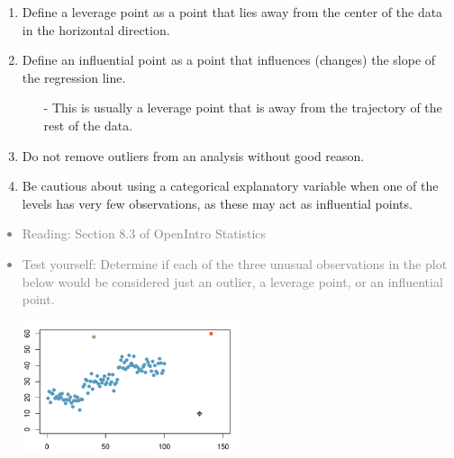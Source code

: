 \documentclass[11pt]{article}
\newcommand{\gray}[1]{\textcolor{gray}{#1}}
\begin{document}
\vspace{0.48cm}

%

\begin{enumerate}[resume]
\renewcommand\labelenumi{\textcolor{light}{\textbf{LO \theenumi.}}}

\item Define a leverage point as a point that lies away from the center of the data in the horizontal direction.

\item Define an influential point as a point that influences (changes) the slope of the regression line.
\begin{itemize}
\item[-] This is usually a leverage point that is away from the trajectory of the rest of the data.
\end{itemize}

\item Do not remove outliers from an analysis without good reason.

\item Be cautious about using a categorical explanatory variable when one of the levels has very few observations, as these may act as influential points.

\end{enumerate}

\gray{
{\it
\vspace{-0.55cm}
\begin{itemize}
\renewcommand{\labelitemi}{{\textcolor{dark}{$\ast$}}}
\item Reading: Section 8.3 of OpenIntro Statistics
\item Test yourself: Determine if each of the three unusual observations in the plot below would be considered just an outlier, a leverage point, or an influential point.
\begin{center}
\includegraphics[width=0.5\textwidth]{figures/outliers}
\end{center}
\end{itemize}
}}

%
\end{document}
